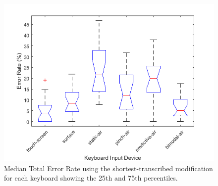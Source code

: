 \begin{figure}[t]
	\centering
	\includegraphics{Figures/fig_totER_short_boxplot}
	\caption[Total Error Rate Boxplot for Modified-shortest]{Median Total Error Rate using the shortest-transcribed modification for each keyboard showing the 25th and 75th percentiles.}
	\label{fig_totER_short_boxplot}
\end{figure}

